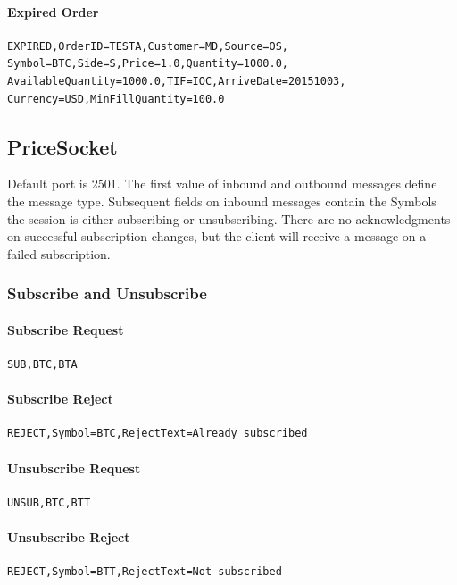 \documentclass[Letter]{article}
\begin{document}
\paragraph{Expired Order}
\begin{verbatim}
EXPIRED,OrderID=TESTA,Customer=MD,Source=OS,
Symbol=BTC,Side=S,Price=1.0,Quantity=1000.0,
AvailableQuantity=1000.0,TIF=IOC,ArriveDate=20151003,
Currency=USD,MinFillQuantity=100.0
\end{verbatim}


\subsection{PriceSocket}

Default port is 2501.  The first value of inbound and outbound
messages define the message type.  Subsequent fields on inbound messages
contain the Symbols the session is either subscribing or unsubscribing.
There are no acknowledgments on successful subscription changes, but
the client will receive a message on a failed subscription.

\subsubsection{Subscribe and Unsubscribe}

\paragraph{Subscribe Request}
\begin{verbatim}
SUB,BTC,BTA
\end{verbatim}

\paragraph{Subscribe Reject}
\begin{verbatim}
REJECT,Symbol=BTC,RejectText=Already subscribed
\end{verbatim}

\paragraph{Unsubscribe Request}
\begin{verbatim}
UNSUB,BTC,BTT
\end{verbatim}

\paragraph{Unsubscribe Reject}
\begin{verbatim}
REJECT,Symbol=BTT,RejectText=Not subscribed
\end{verbatim}
\end{document}

